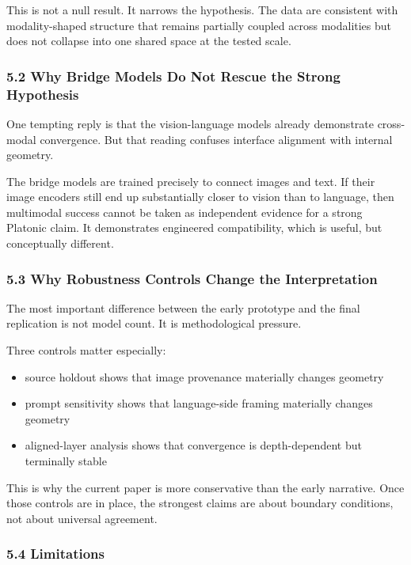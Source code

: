 \documentclass[
]{article}
\providecommand{\tightlist}{%
  \setlength{\itemsep}{0pt}\setlength{\parskip}{0pt}}
\begin{document}
This is not a null result. It narrows the hypothesis. The data are
consistent with modality-shaped structure that remains partially coupled
across modalities but does not collapse into one shared space at the
tested scale.

\subsubsection{5.2 Why Bridge Models Do Not Rescue the Strong
Hypothesis}\label{why-bridge-models-do-not-rescue-the-strong-hypothesis}

One tempting reply is that the vision-language models already
demonstrate cross-modal convergence. But that reading confuses interface
alignment with internal geometry.

The bridge models are trained precisely to connect images and text. If
their image encoders still end up substantially closer to vision than to
language, then multimodal success cannot be taken as independent
evidence for a strong Platonic claim. It demonstrates engineered
compatibility, which is useful, but conceptually different.

\subsubsection{5.3 Why Robustness Controls Change the
Interpretation}\label{why-robustness-controls-change-the-interpretation}

The most important difference between the early prototype and the final
replication is not model count. It is methodological pressure.

Three controls matter especially:

\begin{itemize}
\tightlist
\item
  source holdout shows that image provenance materially changes geometry
\item
  prompt sensitivity shows that language-side framing materially changes
  geometry
\item
  aligned-layer analysis shows that convergence is depth-dependent but
  terminally stable
\end{itemize}

This is why the current paper is more conservative than the early
narrative. Once those controls are in place, the strongest claims are
about boundary conditions, not about universal agreement.

\subsubsection{5.4 Limitations}\label{limitations}
\end{document}
